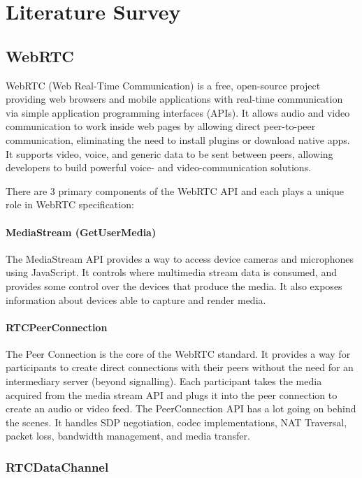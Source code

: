 \chapter{Literature Survey}

\section{WebRTC}

WebRTC (Web Real-Time Communication) is a free, open-source project providing web browsers and 
mobile applications with real-time communication via simple application programming interfaces (APIs). 
It allows audio and video communication to work inside web pages by allowing direct peer-to-peer 
communication, eliminating the need to install plugins or download native apps.
It supports video, voice, and generic data to be sent between peers, allowing developers 
to build powerful voice- and video-communication solutions.

There are 3 primary components of the WebRTC API and each plays a unique role in WebRTC specification:

\subsubsection{MediaStream (GetUserMedia)}

The MediaStream API provides a way to access device cameras and microphones using JavaScript. 
It controls where multimedia stream data is consumed, and provides some control over the devices 
that produce the media. It also exposes information about devices able to capture and render media.

\subsubsection{RTCPeerConnection}

The Peer Connection is the core of the WebRTC standard. It provides a way for participants to 
create direct connections with their peers without the need for an intermediary 
server (beyond signalling). Each participant takes the media acquired from the media 
stream API and plugs it into the peer connection to create an audio or video feed.  
The PeerConnection API has a lot going on behind the scenes. It handles SDP negotiation, 
codec implementations, NAT Traversal, packet loss, bandwidth management, and media transfer.

\subsection{RTCDataChannel}


